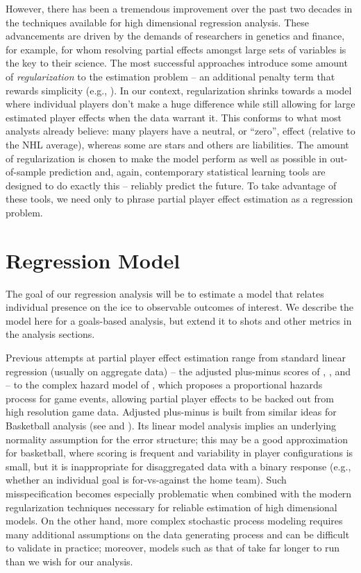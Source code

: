 However, there has been a tremendous improvement over the past two decades in
the techniques available for high dimensional regression analysis.  These
advancements are driven by the demands of researchers in genetics and finance,
for example, for whom resolving partial effects amongst  large sets of
variables is the key to their science.  The most successful approaches
introduce some amount of \textit{regularization}  to the estimation
problem -- an additional penalty term that rewards simplicity (e.g.,
\cite{hastie:tibsh:fried:2001}).  In our context, regularization shrinks
towards a model where individual players don't make a huge difference while
still allowing for large estimated player effects when the data warrant it.
This conforms to what most analysts already believe: many players have a
neutral, or ``zero'', effect (relative to the NHL average), whereas some are
stars and others are liabilities.     The amount of regularization is chosen
to make the model perform as well as possible in out-of-sample prediction and,
again, contemporary statistical learning tools are designed to do exactly
this -- reliably predict the future. To take advantage of these tools, we  need
only to phrase partial player effect estimation  as a regression problem.


 
\section{Regression Model}
\label{sec:regression}

The goal of our regression analysis will be to estimate a model that  relates
individual presence on the ice to observable outcomes of interest.  We
describe the model here for a goals-based analysis, but extend it to shots and
other metrics in the analysis sections.

Previous attempts at partial player effect estimation range from standard
linear regression (usually on aggregate data) -- the adjusted plus-minus
scores of \cite{awa09}, \cite{schlocwel10},  and \cite{mac10} -- to the complex
hazard model of
\cite{ThoVenJen12}, which proposes a proportional hazards process for
game events, allowing partial player effects to be backed out from high
resolution game data. 
Adjusted plus-minus is built from similar ideas for Basketball analysis (see
\cite{ros04}and \cite{ilabar08}). Its linear model analysis implies an
underlying normality assumption for the error structure; this may be a good
approximation for basketball, where scoring is frequent and variability in
player configurations is small, but it is  inappropriate for disaggregated
data with a binary response (e.g., whether an individual goal is for-vs-against
the home team).  Such misspecification becomes especially problematic when
combined with the modern regularization techniques necessary for reliable
estimation of high dimensional models.  On the other hand, more complex
stochastic process modeling requires many additional assumptions on the data
generating process and can be difficult to validate in practice; moreover,
models such as that of \cite{ThoVenJen12} take far longer to run than we wish
for our analysis.

